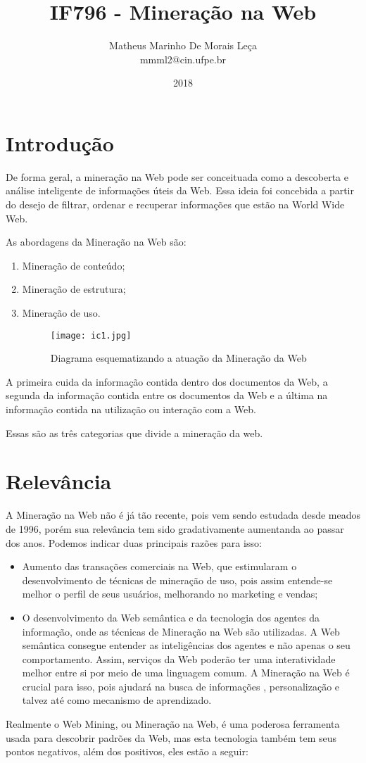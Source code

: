 \documentclass [a4paper, 10pt] {article}
\title{IF796 - Mineração na Web}
\author{Matheus Marinho De Morais Leça\\ mmml2@cin.ufpe.br}
\date{2018}
\begin{document}
\maketitle 
\section{Introdução}
 
De forma geral, a mineração na Web pode ser conceituada como a descoberta e análise inteligente de informações úteis da Web\cite{artigo}.
  Essa ideia foi concebida a partir do desejo de filtrar, ordenar e recuperar informações que estão na World Wide Web\cite{LivroA}.

 As abordagens da Mineração na Web são: \cite{site}
 \begin{enumerate}
 \item Mineração de conteúdo;
 \item Mineração de estrutura;
 \item Mineração de uso.
 \begin{figure}[!htb]
 \centering
 \texttt{[image: ic1.jpg]}
 \caption{Diagrama esquematizando a atuação da Mineração da Web }
 \end{figure}
\end{enumerate}  

A primeira cuida da informação contida dentro dos documentos da Web, a segunda da informação contida entre os documentos da Web e a última na informação contida na utilização ou interação com a Web\cite{LivroB}. 

Essas são as três categorias que divide a mineração da web. 
\section{Relevância}
A Mineração na Web não é já tão recente, pois vem sendo estudada desde meados de 1996, porém sua relevância tem sido gradativamente aumentanda ao passar dos anos. Podemos indicar duas principais razões para isso: \cite{wiki:xxx}

\begin{itemize}
\item Aumento das transações comerciais na Web, que estimularam o desenvolvimento de técnicas de mineração de uso, pois assim entende-se melhor o perfil de seus usuários, melhorando no marketing e vendas;
\item O desenvolvimento da Web semântica e da tecnologia dos agentes da informação, onde as técnicas de Mineração na Web são utilizadas. A Web semântica consegue entender as inteligências dos agentes e não apenas o seu comportamento. Assim, serviços da Web poderão ter uma interatividade melhor entre si por meio de uma linguagem comum. A Mineração na Web é crucial para isso, pois ajudará na busca de informações , personalização e talvez até como mecanismo de aprendizado. 
\end{itemize}
Realmente o Web Mining, ou Mineração na Web, é uma poderosa ferramenta usada para descobrir padrões da Web, mas esta tecnologia também tem seus pontos negativos, além dos positivos, eles estão a seguir\cite{wiki:xxx}:
\end{document}
